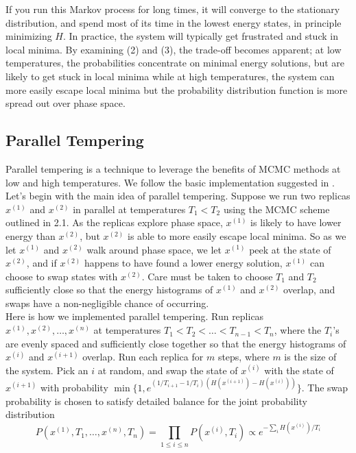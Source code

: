 \documentclass[12pt]{article}
\newcommand{\1}{\mathbf{1}}
\theoremstyle{remark}
\theoremstyle{definition}
\theoremstyle{proposition}
\theoremstyle{lemma}
\theoremstyle{definition}
\begin{document}
	If you run this Markov process for long times, it will converge to the stationary distribution, and spend most of its time in the lowest energy states, in principle minimizing $H$. In practice, the system will typically get frustrated and stuck in local minima. By examining (2) and (3), the trade-off becomes apparent; at low temperatures, the probabilities concentrate on minimal energy solutions, but are likely to get stuck in local minima while at high temperatures, the system can more easily escape local minima but the probability distribution function is more spread out over phase space.
	
	\subsection{Parallel Tempering}
	\indent \indent Parallel tempering is a technique to leverage the benefits of MCMC methods at low and high temperatures. We follow the basic implementation suggested in \cite{B509983H}. \\
	\indent Let's begin with the main idea of parallel tempering. Suppose we run two replicas $x^{(1)}$ and $x^{(2)}$ in parallel at temperatures $T_1 < T_2$ using the MCMC scheme outlined in 2.1. As the replicas explore phase space, $x^{(1)}$ is likely to have lower energy than $x^{(2)}$, but $x^{(2)}$ is able to more easily escape local minima. So as we let $x^{(1)}$ and $x^{(2)}$ walk around phase space, we let $x^{(1)}$ peek at the state of $x^{(2)}$, and if $x^{(2)}$ happens to have found a lower energy solution, $x^{(1)}$ can choose to swap states with $x^{(2)}$. Care must be taken to choose $T_1$ and $T_2$ sufficiently close so that the energy histograms of $x^{(1)}$ and $x^{(2)}$ overlap, and swaps have a non-negligible chance of occurring. \\
	\indent Here is how we implemented parallel tempering. Run replicas $x^{(1)}, x^{(2)}, \ldots, x^{(n)}$ at temperatures $T_1 < T_2 < \ldots < T_{n-1} < T_n$, where the $T_i$'s are evenly spaced and sufficiently close together so that the energy histograms of $x^{(i)}$ and $x^{(i+1)}$ overlap. Run each replica for $m$ steps, where $m$ is the size of the system. Pick an $i$ at random, and swap the state of  $x^{(i)}$ with the state of $x^{(i+1)}$ with probability $\min\{1, e^{(1/T_{i+1}-1/{T_i})(H(x^{(i+1)}) - H(x^{(i)}))}\}$. The swap probability is chosen to satisfy detailed balance for the joint probability distribution 
	$$P(x^{(1)}, T_1, \ldots, x^{(n)}, T_n) = \prod_{1\leq i \leq n} P(x^{(i)}, T_i) \propto e^{-\sum_i H(x^{(i)})/T_i}$$
\end{document}
